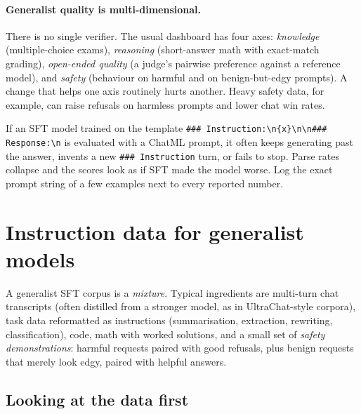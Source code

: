 \paragraph{Generalist quality is multi-dimensional.} There is no single verifier. The usual
dashboard has four axes: \emph{knowledge} (multiple-choice exams), \emph{reasoning} (short-answer
math with exact-match grading), \emph{open-ended quality} (a judge's pairwise preference against
a reference model), and \emph{safety} (behaviour on harmful and on benign-but-edgy prompts). A
change that helps one axis routinely hurts another. Heavy safety data, for example, can raise
refusals on harmless prompts and lower chat win rates.

\begin{pitfall}
If an SFT model trained on the template \texttt{\#\#\# Instruction:\textbackslash n\{x\}\textbackslash n\textbackslash n\#\#\# Response:\textbackslash n}
is evaluated with a ChatML prompt, it often keeps generating past the answer, invents a new
\texttt{\#\#\# Instruction} turn, or fails to stop. Parse rates collapse and the scores look as
if SFT made the model worse. Log the exact prompt string of a few examples next to every
reported number.
\end{pitfall}

\section{Instruction data for generalist models}\label{sec:align:data}


A generalist SFT corpus is a \emph{mixture}. Typical ingredients are multi-turn chat
transcripts (often distilled from a stronger model, as in UltraChat-style corpora), task data
reformatted as instructions (summarisation, extraction, rewriting, classification), code, math
with worked solutions, and a small set of \emph{safety demonstrations}: harmful requests paired
with good refusals, plus benign requests that merely look edgy, paired with helpful answers.

\subsection{Looking at the data first}

